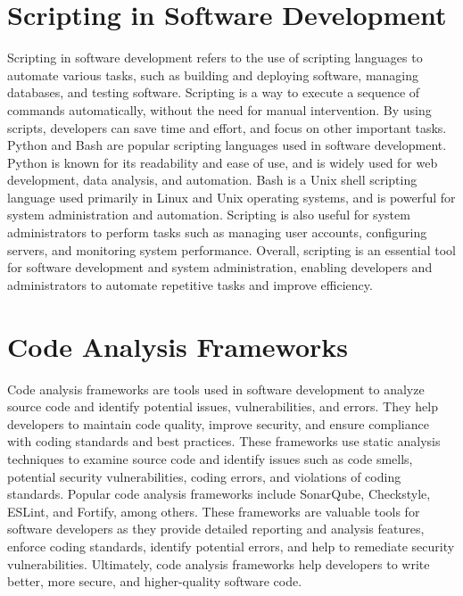 \section{Scripting in Software Development}
Scripting in software development refers to the use of scripting languages to automate various tasks, such as building and deploying software, managing databases, and testing software.
Scripting is a way to execute a sequence of commands automatically, without the need for manual intervention.
By using scripts, developers can save time and effort, and focus on other important tasks. Python and Bash are popular scripting languages used in software development.
Python is known for its readability and ease of use, and is widely used for web development, data analysis, and automation.
Bash is a Unix shell scripting language used primarily in Linux and Unix operating systems, and is powerful for system administration and automation.
Scripting is also useful for system administrators to perform tasks such as managing user accounts, configuring servers, and monitoring system performance.
Overall, scripting is an essential tool for software development and system administration, enabling developers and administrators to automate repetitive tasks and improve efficiency.

\section{Code Analysis Frameworks}
Code analysis frameworks are tools used in software development to analyze source code and identify potential issues, vulnerabilities, and errors.
They help developers to maintain code quality, improve security, and ensure compliance with coding standards and best practices.
These frameworks use static analysis techniques to examine source code and identify issues such as code smells, potential security vulnerabilities, coding errors, and violations of coding standards.
Popular code analysis frameworks include SonarQube, Checkstyle, ESLint, and Fortify, among others.
These frameworks are valuable tools for software developers as they provide detailed reporting and analysis features, enforce coding standards, identify potential errors, and help to remediate security vulnerabilities.
Ultimately, code analysis frameworks help developers to write better, more secure, and higher-quality software code.

